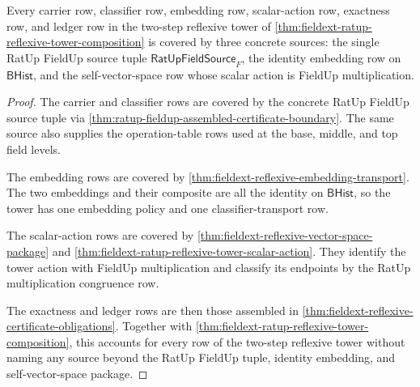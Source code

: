 \begin{theorem}
\label{thm:fieldext-ratup-reflexive-tower-ledger-coverage}
Every carrier row, classifier row, embedding row, scalar-action row, exactness
row, and ledger row in the two-step reflexive tower of
\autoref{thm:fieldext-ratup-reflexive-tower-composition} is covered by three
concrete sources: the single RatUp FieldUp source tuple
$\mathsf{RatUpFieldSource}_F$, the identity embedding row on
$\mathsf{BHist}$, and the self-vector-space row whose scalar action is FieldUp
multiplication.
\end{theorem}
\begin{proof}
The carrier and classifier rows are covered by the concrete RatUp FieldUp
source tuple via
\autoref{thm:ratup-fieldup-assembled-certificate-boundary}. The same source
also supplies the operation-table rows used at the base, middle, and top field
levels.

The embedding rows are covered by
\autoref{thm:fieldext-reflexive-embedding-transport}. The two embeddings and
their composite are all the identity on $\mathsf{BHist}$, so the tower has one
embedding policy and one classifier-transport row.

The scalar-action rows are covered by
\autoref{thm:fieldext-reflexive-vector-space-package} and
\autoref{thm:fieldext-ratup-reflexive-tower-scalar-action}. They identify the
tower action with FieldUp multiplication and classify its endpoints by the
RatUp multiplication congruence row.

The exactness and ledger rows are then those assembled in
\autoref{thm:fieldext-reflexive-certificate-obligations}. Together with
\autoref{thm:fieldext-ratup-reflexive-tower-composition}, this accounts for
every row of the two-step reflexive tower without naming any source beyond the
RatUp FieldUp tuple, identity embedding, and self-vector-space package.
\end{proof}
